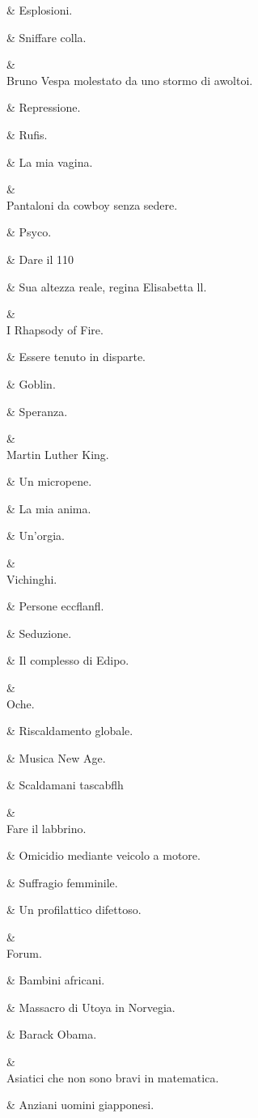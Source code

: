 &
Esplosioni.

&
Sniffare colla.

&
\\
Bruno Vespa
molestato da
uno stormo di
awoltoi.

&
Repressione.

&
Rufis.

&
La mia vagina.

&
\\
Pantaloni da
cowboy senza
sedere.

&
Psyco.

&
Dare il 110%

&
Sua altezza
reale, regina
Elisabetta ll.

&
\\
I Rhapsody of
Fire.

&
Essere tenuto in
disparte.

&
Goblin.

&
Speranza.

&
\\
Martin Luther
King.

&
Un micropene.

&
La mia anima.

&
Un’orgia.

&
\\
Vichinghi.

&
Persone
eccﬂanﬂ.

&
Seduzione.

&
Il complesso di
Edipo.

&
\\
Oche.

&
Riscaldamento
globale.

&
Musica New Age.

&
Scaldamani
tascabﬂh

&
\\
Fare il labbrino.

&
Omicidio
mediante veicolo
a motore.

&
Suffragio
femminile.

&
Un profilattico
difettoso.

&
\\
Forum.

&
Bambini africani.

&
Massacro
di Utoya in
Norvegia.

&
Barack Obama.

&
\\
Asiatici che non
sono bravi in
matematica.

&
Anziani uomini
giapponesi.

